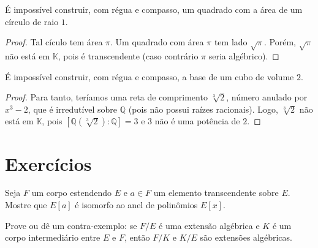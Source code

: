\begin{prop}
    É impossível construir, com régua e compasso, um quadrado com a área de um círculo de raio $1$.
\end{prop}
\begin{proof}
Tal cículo tem área $\pi$. Um quadrado com área $\pi$ tem lado $\sqrt \pi$. Porém, $\sqrt \pi$ não está em $\mathbb K$, pois é transcendente (caso contrário $\pi$ seria algébrico).
\end{proof}

\begin{prop}
É impossível construir, com régua e compasso, a base de um cubo de volume $2$.
\end{prop}
\begin{proof}
    Para tanto, teríamos uma reta de comprimento $\sqrt[3]{2}$, número anulado por $x^3-2$, que é irredutível sobre $\mathbb Q$ (pois não possui raízes racionais). Logo, $\sqrt[3]{2}$ não está em $\mathbb K$, pois $[\mathbb Q(\sqrt[3]{2}):\mathbb Q]=3$ e $3$ não é uma potência de $2$.
\end{proof}
\section{Exercícios}
\begin{exer}
    Seja $F$ um corpo estendendo $E$ e $a \in F$ um elemento transcendente sobre $E$. Mostre que $E[a]$ é isomorfo ao anel de polinômios $E[x]$.
\end{exer}

\begin{exer}
    Prove ou dê um contra-exemplo: se $F/E$ é uma extensão algébrica e $K$ é um corpo intermediário entre $E$ e $F$, então $F/K$ e $K/E$ são extensões algébricas.
\end{exer}

